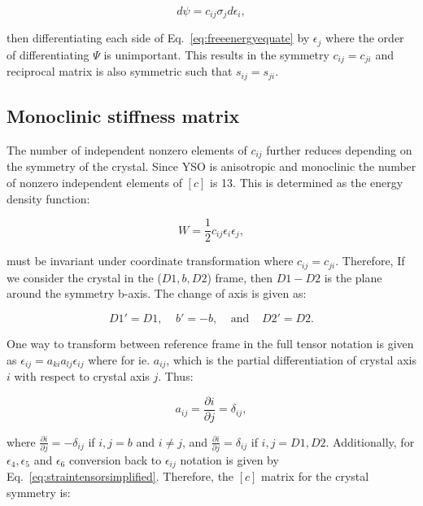 \begin{equation}
\label{eq:freeenergyequate}
d\psi =c_{ij}\sigma_{j}d\epsilon_{i},
\end{equation} 


\noindent then differentiating each side of Eq.~\ref{eq:freeenergyequate} by $\epsilon_{j}$ where the order of differentiating $\Psi$ is unimportant. This results in the symmetry $c_{ij}=c_{ji}$ and reciprocal matrix is also symmetric such that $s_{ij}=s_{ji}$.  

\subsection{Monoclinic stiffness matrix}

The number of independent nonzero elements of $c_{ij}$ further reduces depending on the symmetry of the crystal. Since YSO is anisotropic and monoclinic the number of nonzero independent elements of $[c]$ is 13. This is determined as the energy density function: 

\begin{equation}
\label{eq:energyW}
W=\frac{1}{2}c_{ij}\epsilon_{i}\epsilon_{j},
\end{equation}

\noindent must be invariant under coordinate transformation where $c_{ij}=c_{ji}$. Therefore, If we consider the crystal in the ($D1,b,D2$) frame, then $D1-D2$ is the plane around the symmetry b-axis. The change of axis is given as: 

\begin{equation}
\label{eq:planofsymmetry}
D1'=D1, \;\;\;\; b' = -b, \;\;\;\; \textrm{and} \;\;\;\; D2'=D2.
\end{equation}

One way to transform between reference frame in the full tensor notation is given as $\epsilon_{ij}=a_{ki}a_{lj}\epsilon_{ij}$ where for ie. $a_{ij}$, which is the partial differentiation of crystal axis $i$ with respect to crystal axis $j$. Thus: 

\begin{equation}
\label{eq:apartialdiff}
a_{ij}=\frac{\partial i}{\partial j}=\delta_{ij}, 
\end{equation}

\noindent where $\frac{\partial i}{\partial j}=-\delta_{ij}$ if $i,j=b$ and $i\neq j$, and $\frac{\partial i}{\partial j}=\delta_{ij}$ if $i,j=D1,D2$. Additionally, for $\epsilon_{4},\epsilon_{5}$ and $\epsilon_{6}$ conversion back to $\epsilon_{ij}$ notation is given by Eq.~\ref{eq:straintensorsimplified}. Therefore, the $[c]$ matrix for the crystal symmetry is: 


